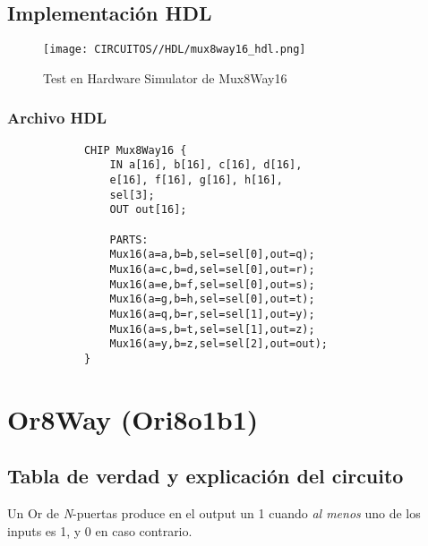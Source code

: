 \documentclass[12pt]{article}
\begin{document}
		\subsection{Implementación HDL}
		\begin{figure}[H]
			\centering
			\texttt{[image: CIRCUITOS//HDL/mux8way16\_hdl.png]}
			\caption{Test en Hardware Simulator de Mux8Way16 \cite{nand2tetris}}
			\label{fig:hdlmux8way16}
		\end{figure}
		\subsubsection{Archivo HDL}
		\begin{lstlisting}
			CHIP Mux8Way16 {
				IN a[16], b[16], c[16], d[16],
				e[16], f[16], g[16], h[16],
				sel[3];
				OUT out[16];

				PARTS:
				Mux16(a=a,b=b,sel=sel[0],out=q);
				Mux16(a=c,b=d,sel=sel[0],out=r);
				Mux16(a=e,b=f,sel=sel[0],out=s);
				Mux16(a=g,b=h,sel=sel[0],out=t);
				Mux16(a=q,b=r,sel=sel[1],out=y);
				Mux16(a=s,b=t,sel=sel[1],out=z);
				Mux16(a=y,b=z,sel=sel[2],out=out);
			}
		\end{lstlisting}
		\newpage



		\section{Or8Way (Ori8o1b1)}
		\subsection{Tabla de verdad y explicación del circuito}
		Un Or de \textit{N}-puertas produce en el output un 1 cuando \textit{al menos} uno de los inputs es 1, y 0 en caso contrario. \cite{nisan_nand2tetris_2005}
		\begin{table}[H]
			\centering
			\caption{Tabla de verdad de Or8Way}
			\label{tab:tab_Or8way}
		\end{table}
\end{document}
